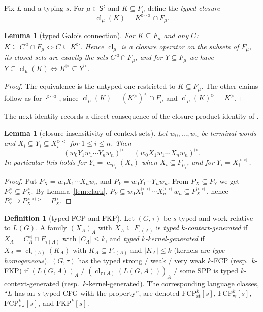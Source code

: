 \documentclass[11pt]{article}
\numberwithin{equation}{section}
\theoremstyle{plain}
\newtheorem{lemma}[theorem]{Lemma}
\theoremstyle{definition}
\newtheorem{definition}[theorem]{Definition}
\theoremstyle{remark}
\theoremstyle{plain}
\newcommand{\R}{^{\rhd}}
\newcommand{\Lc}{^{\lhd}}
\newcommand{\RL}{^{\rhd\lhd}}
\newcommand{\cl}{\operatorname{cl}}
\newcommand{\tFCP}[3]{\mathrm{FCP}^{#1}_{\mathrm{#2}}[#3]}
\newcommand{\tFKP}[3]{\mathrm{FKP}^{#1}_{\mathrm{#2}}[#3]}
\begin{document}
Fix $L$ and a typing $s$.  For $\mu\in\mathsf S^\sharp$ and $K\subseteq F_\mu$
define the \emph{typed closure}
\[
\cl_\mu(K)=K\RL\cap F_\mu .
\]

\begin{lemma}[typed Galois connection]\label{lem:typed-galois}
For $K\subseteq F_\mu$ and any $C$: $K\subseteq C\Lc\cap F_\mu\iff
C\subseteq K\R$.  Hence $\cl_\mu$ is a closure operator on the subsets of
$F_\mu$, its closed sets are exactly the sets $C\Lc\cap F_\mu$, and for
$Y\subseteq F_\mu$ we have $Y\subseteq\cl_\mu(K)\iff K\R\subseteq Y\R$.
\end{lemma}
\begin{proof}
The equivalence is the untyped one restricted to $K\subseteq F_\mu$.  The
other claims follow as for $\cdot\RL$, since $\cl_\mu(K)=(K\R)\Lc\cap F_\mu$
and $\cl_\mu(K)\R=K\R$.
\end{proof}

The next identity records a direct consequence of the closure-product
identity of \citet[Sec.~3, Eq.~(1)]{ky2017}.

\begin{lemma}[closure-insensitivity of context sets]\label{lem:star}
Let $w_0,\dots,w_n$ be terminal words and $X_i\subseteq Y_i\subseteq X_i\RL$
for $1\le i\le n$.  Then
\[
(w_0Y_1w_1\cdots Y_nw_n)\R=(w_0X_1w_1\cdots X_nw_n)\R .
\]
In particular this holds for $Y_i=\cl_{\mu_i}(X_i)$ when $X_i\subseteq
F_{\mu_i}$, and for $Y_i=X_i\RL$.
\end{lemma}
\begin{proof}
Put $P_X=w_0X_1\cdots X_nw_n$ and $P_Y=w_0Y_1\cdots Y_nw_n$.  From $P_X\subseteq
P_Y$ we get $P_Y\R\subseteq P_X\R$.  By Lemma~\ref{lem:clark},
$P_Y\subseteq w_0X_1\RL\cdots X_n\RL w_n\subseteq P_X\RL$, hence
$P_Y\R\supseteq P_X\RL{}\R=P_X\R$.
\end{proof}

\begin{definition}[typed FCP and FKP]\label{def:typed-props}
Let $(G,\tau)$ be $s$-typed and work relative to $L(G)$.  A family
$(X_A)_A$ with $X_A\subseteq F_{\tau(A)}$ is \emph{typed $k$-context-generated}
if $X_A=C_A\Lc\cap F_{\tau(A)}$ with $|C_A|\le k$, and \emph{typed
$k$-kernel-generated} if $X_A=\cl_{\tau(A)}(K_A)$ with
$K_A\subseteq F_{\tau(A)}$ and $|K_A|\le k$ (kernels are
\emph{type-homogeneous}).  $(G,\tau)$ has the typed strong / weak / very weak
$k$-FCP (resp.\ $k$-FKP) if $(L(G,A))_A$ / $(\cl_{\tau(A)}(L(G,A)))_A$ / some
SPP is typed $k$-context-generated (resp.\ $k$-kernel-generated).  The
corresponding language classes, ``$L$ has an $s$-typed CFG with the
property'', are denoted $\tFCP{k}{st}{s}$, $\tFCP{k}{w}{s}$, $\tFCP{k}{vw}{s}$,
and $\tFKP{k}{\cdot}{s}$.
\end{definition}
\end{document}
